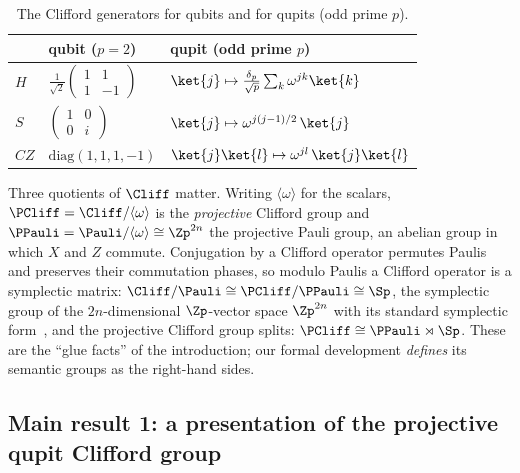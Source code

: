 \begin{table}[h]
\caption{The Clifford generators for qubits and for qupits (odd prime $p$).}
\label{tab:gates}
\centering
\begin{tabular}{lll}
\toprule
 & qubit ($p = 2$) & qupit (odd prime $p$) \\
\midrule
$H$  & $\frac{1}{\sqrt2}\begin{pmatrix}1&1\\1&-1\end{pmatrix}$
     & $\ket{j} \mapsto \tfrac{\delta_p}{\sqrt p}\sum_k \omega^{jk}\ket{k}$ \\[2ex]
$S$  & $\begin{pmatrix}1&0\\0&i\end{pmatrix}$
     & $\ket{j} \mapsto \omega^{j(j-1)/2}\,\ket{j}$ \\[2ex]
$CZ$ & $\mathrm{diag}(1,1,1,-1)$
     & $\ket{j}\ket{l} \mapsto \omega^{jl}\,\ket{j}\ket{l}$ \\
\bottomrule
\end{tabular}
\end{table}

Three quotients of $\Cliff$ matter.  Writing $\langle\omega\rangle$ for
the scalars, $\PCliff = \Cliff/\langle\omega\rangle$ is the
\emph{projective} Clifford group and $\PPauli =
\Pauli/\langle\omega\rangle \cong \Zp^{2n}$ the projective Pauli group,
an abelian group in which $X$ and $Z$ commute.  Conjugation by a Clifford
operator permutes Paulis and preserves their commutation phases, so
modulo Paulis a Clifford operator is a symplectic matrix: $\Cliff/\Pauli
\cong \PCliff/\PPauli \cong \Sp$, the symplectic group of the
$2n$-dimensional $\Zp$-vector space $\Zp^{2n}$ with its standard
symplectic form~\cite{bian2026qudit}, and the projective Clifford group
splits: $\PCliff \cong \PPauli \rtimes \Sp$.  These are the ``glue
facts'' of the introduction; our formal development \emph{defines} its
semantic groups as the right-hand sides.

\subsection{Main result 1: a presentation of the projective qupit Clifford group}

